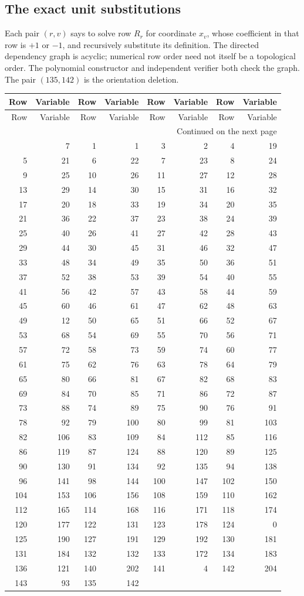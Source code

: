 \subsection{The exact unit substitutions}
Each pair $(r,v)$ says to solve row $R_r$ for coordinate $x_v$, whose coefficient in that row is $+1$ or $-1$, and recursively substitute its definition. The directed dependency graph is acyclic; numerical row order need not itself be a topological order. The polynomial constructor and independent verifier both check the graph. The pair $(135,142)$ is the orientation deletion.
\begingroup\small
\begin{longtable}{rr@{\qquad}rr@{\qquad}rr@{\qquad}rr}\toprule
Row&Variable&Row&Variable&Row&Variable&Row&Variable\\\midrule
\endfirsthead
\toprule Row&Variable&Row&Variable&Row&Variable&Row&Variable\\\midrule
\endhead
\midrule\multicolumn{8}{r}{Continued on the next page}\\\endfoot
\bottomrule\endlastfoot
0&7&1&1&3&2&4&19\\
5&21&6&22&7&23&8&24\\
9&25&10&26&11&27&12&28\\
13&29&14&30&15&31&16&32\\
17&20&18&33&19&34&20&35\\
21&36&22&37&23&38&24&39\\
25&40&26&41&27&42&28&43\\
29&44&30&45&31&46&32&47\\
33&48&34&49&35&50&36&51\\
37&52&38&53&39&54&40&55\\
41&56&42&57&43&58&44&59\\
45&60&46&61&47&62&48&63\\
49&12&50&65&51&66&52&67\\
53&68&54&69&55&70&56&71\\
57&72&58&73&59&74&60&77\\
61&75&62&76&63&78&64&79\\
65&80&66&81&67&82&68&83\\
69&84&70&85&71&86&72&87\\
73&88&74&89&75&90&76&91\\
78&92&79&100&80&99&81&103\\
82&106&83&109&84&112&85&116\\
86&119&87&124&88&120&89&125\\
90&130&91&134&92&135&94&138\\
96&141&98&144&100&147&102&150\\
104&153&106&156&108&159&110&162\\
112&165&114&168&116&171&118&174\\
120&177&122&131&123&178&124&0\\
125&190&127&191&129&192&130&181\\
131&184&132&132&133&172&134&183\\
136&121&140&202&141&4&142&204\\
143&93&135&142&&&&\\
\end{longtable}\endgroup
